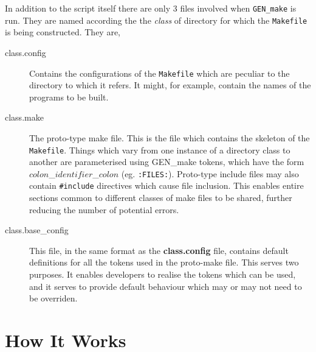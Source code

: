 In addition to the script itself there are only 3 files involved when 
\verb+GEN_make+ is run. They are named according the the {\em class} of
directory for which the \verb+Makefile+ is being constructed. They are,
\begin{description}
\item[class.config] Contains the configurations of the \verb+Makefile+
  which are peculiar to the directory to which it refers. It might, for
  example, contain the names of the programs to be built.

\item[class.make] The proto-type make file. This is the file which 
  contains the skeleton of the \verb+Makefile+. Things which vary from
  one instance of a directory class to another are parameterised using
  GEN\_make tokens, which have the form $colon$\_$identifier$\_$colon$
  (eg. \verb+:FILES:+). Proto-type include files may also contain
  \verb+#include+ directives which cause file inclusion. This enables
  entire sections common to different classes of make files to be shared,
  further reducing the number of potential errors.

\item[class.base\_config]
  This file, in the same format as the {\bf class.config} file, contains
  default definitions for all the tokens used in the proto-make file.
  This serves two purposes. It enables developers to realise the tokens
  which can be used, and it serves to provide default behaviour which
  may or may not need to be overriden.
\end{description}


\section{How It Works}

